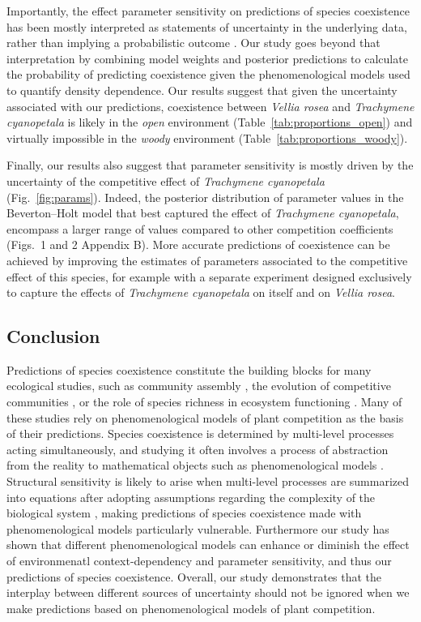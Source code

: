 \begin{refsection}
Importantly, the effect parameter sensitivity on predictions of species coexistence has been mostly interpreted as statements of uncertainty in the underlying data, rather than implying a probabilistic outcome \citep{terry2021natural,matias2018experimental}. Our study goes beyond that interpretation by combining model weights and posterior predictions to calculate the probability of predicting coexistence given the phenomenological models used to quantify density dependence. Our results suggest that given the uncertainty associated with our predictions, coexistence between \textit{Vellia rosea} and \textit{Trachymene cyanopetala} is likely in the \textit{open} environment (Table~\ref{tab:proportions_open}) and virtually impossible in the \textit{woody} environment (Table~\ref{tab:proportions_woody}).


Finally, our results also suggest that parameter sensitivity is mostly driven by the uncertainty of the competitive effect of \textit{Trachymene cyanopetala} (Fig.~\ref{fig:params}). Indeed, the posterior distribution of parameter values in the Beverton--Holt model that best captured the effect of \textit{Trachymene cyanopetala}, encompass a larger range of values compared to other competition coefficients (Figs.~1 and 2 Appendix B). More accurate predictions of coexistence can be achieved by improving the estimates of parameters associated to the competitive effect of this species, for example with a separate experiment designed exclusively to capture the effects of \textit{Trachymene cyanopetala}  on itself and on \textit{Vellia rosea}.


\subsection*{Conclusion}


Predictions of species coexistence constitute the building blocks for many ecological studies, such as community assembly \citep{hillerislambers2012rethinking,kraft2015community, grainger_applying_2019}, the evolution of competitive communities \citep{letten2021using, pastore2021evolution}, or the role of species richness in ecosystem functioning \citep{godoy2020excess}. Many of these studies rely on phenomenological models of plant competition as the basis of their predictions. Species coexistence is determined by multi-level processes acting simultaneously, and studying it often involves a process of abstraction from the reality to mathematical objects such as phenomenological models \citep{levins2006strategies}. Structural sensitivity is likely to arise when multi-level processes are summarized into equations after adopting assumptions regarding the complexity of the biological system \citep{aldebert2018community}, making predictions of species coexistence made with phenomenological models particularly vulnerable. Furthermore our study has shown that different phenomenological models can enhance or diminish the effect of environmenatl context-dependency and parameter sensitivity, and thus our predictions of species coexistence. Overall, our study demonstrates that the interplay between different sources of uncertainty should not be ignored when we make predictions based on phenomenological models of plant competition.


\printbibliography
\end{refsection}
